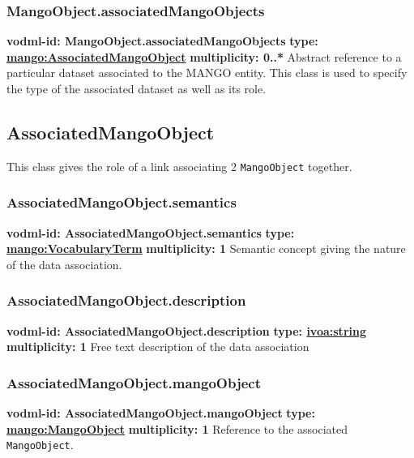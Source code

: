     \subsubsection{MangoObject.associatedMangoObjects}
    \textbf{vodml-id: MangoObject.associatedMangoObjects} \newline
    \textbf{type: \hyperref[sect:AssociatedMangoObject]{mango:AssociatedMangoObject}} \newline
    \textbf{multiplicity: 0..*} \newline
    Abstract reference to a particular dataset associated to the MANGO entity. This class is used to specify the type of the associated dataset as well as its role.

  \subsection{AssociatedMangoObject}
    \label{sect:AssociatedMangoObject}
    This class gives the role of a link associating 2 \texttt{MangoObject} together.

    \subsubsection{AssociatedMangoObject.semantics}
    \textbf{vodml-id: AssociatedMangoObject.semantics} \newline
    \textbf{type: \hyperref[sect:VocabularyTerm]{mango:VocabularyTerm}} \newline
    \textbf{multiplicity: 1} \newline
    Semantic concept giving the nature of the data association.

    \subsubsection{AssociatedMangoObject.description}
    \textbf{vodml-id: AssociatedMangoObject.description} \newline
    \textbf{type: \hyperref[sect:ivoa]{ivoa:string}} \newline
    \textbf{multiplicity: 1} \newline
    Free text description of the data association

    \subsubsection{AssociatedMangoObject.mangoObject}
    \textbf{vodml-id: AssociatedMangoObject.mangoObject} \newline
    \textbf{type: \hyperref[sect:MangoObject]{mango:MangoObject}} \newline
    \textbf{multiplicity: 1} \newline
    Reference to the associated \texttt{MangoObject}.

